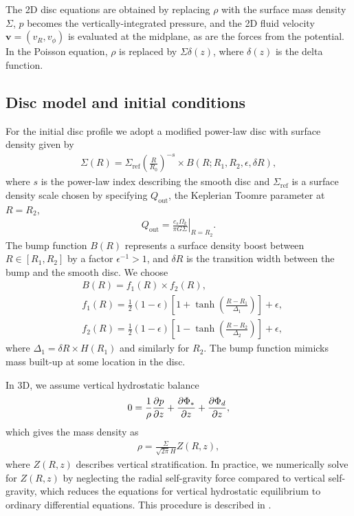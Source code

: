 
The 2D disc equations are obtained by replacing $\rho$ with the surface
mass density $\Sigma$, $p$ becomes the vertically-integrated pressure, 
and the 2D fluid
velocity $\bm{v}=(v_R,v_\phi)$ is evaluated at the midplane, as are
the forces from the potential. In the Poisson equation, $\rho$ is
replaced by $\Sigma\delta(z)$, where $\delta(z)$ is the
delta function. 

\subsection{Disc model and initial conditions}
For the initial disc profile we adopt a modified power-law disc with
surface density given by
\begin{align}
  \Sigma(R) = \Sigma_\mathrm{ref} \left(\frac{R}{R_0}\right)^{-s}\times B(R;
  R_{1}, R_{2}, \epsilon, \delta R), 
\end{align}
where $s$ is the power-law index describing the smooth disc and
$\Sigma_\mathrm{ref}$ is a 
surface density scale chosen by specifying $Q_\mathrm{out}$,
the Keplerian Toomre parameter at $R=R_{2}$,
\begin{align}
  Q_\mathrm{out} = \left.\frac{c_s\Omega_k}{\pi G
    \Sigma}\right|_{R=R_{2}}. 
\end{align}
The bump function
$B(R)$ represents a surface density boost between
$R\in[R_{1},R_{2}]$ by a factor $\epsilon^{-1}>1$,
and $\delta R$ is the transition width between the bump and the
smooth disc. We choose 
\begin{align}
  &B(R) = f_1(R)\times f_2(R),\\
  &f_1(R) = \frac{1}{2}\left(1 - \epsilon\right)\left[1 +
    \tanh\left(\frac{R-R_{1}}{\Delta_1}\right)\right]  + \epsilon,\\
  &f_2(R) = \frac{1}{2}\left(1 - \epsilon\right)\left[1 -
    \tanh\left(\frac{R-R_{2}}{\Delta_2}\right)\right]  + \epsilon,
\end{align}
where $\Delta_1 = \delta R \times H(R_{1})$ and similarly for
$R_{2}$. The bump function mimicks mass built-up at some location in 
the disc. 

In 3D, we assume vertical hydrostatic balance
\begin{align}
  0 = \frac{1}{\rho}\frac{\partial p}{\partial z} + \frac{\partial\Phi_*}{\partial z} + \frac{\partial
    \Phi_d}{\partial z},  
\end{align}
which gives the mass density as 
\begin{align}
  \rho = \frac{\Sigma}{\sqrt{2\pi}H}Z(R,z),
\end{align}
where $Z(R,z)$ describes vertical stratification. In practice, we
numerically solve for $Z(R,z)$ by neglecting the radial self-gravity
force compared to vertical self-gravity, which reduces the equations
for vertical hydrostatic equilibrium to ordinary differential
equations. This procedure is described in \cite{lin12b}. 

